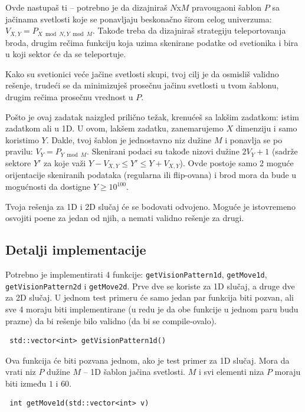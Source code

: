 \documentclass[12pt]{article}
\begin{document}
Ovde nastupaš ti -- potrebno je da dizajniraš $N$x$M$ pravougaoni šablon $P$ sa jačinama svetlosti koje se ponavljaju beskonačno širom celog univerzuma: $V_{X, Y} = P_{X \bmod N, Y \bmod M}$. Takođe treba da dizajniraš strategiju teleportovanja broda, drugim rečima funkciju koja uzima skenirane podatke od svetionika i bira u koji sektor će da se teleportuje.

Kako su svetionici veće jačine svetlosti skupi, tvoj cilj je da osmisliš validno rešenje, trudeći se da minimizuješ prosečnu jačinu svetlosti u tvom šablonu, drugim rečima prosečnu vrednost u $P$.

Pošto je ovaj zadatak naizgled prilično težak, krenućeš sa lakšim zadatkom: istim zadatkom ali u 1D. U ovom, lakšem zadatku, zanemarujemo $X$ dimenziju i samo koristimo $Y$. Dakle, tvoj šablon je jednostavno niz dužine $M$ i ponavlja se po pravilu: $V_Y = P_{Y \bmod M}$. Skenirani podaci su takođe nizovi dužine $2V_Y + 1$ (sadrže sektore $Y'$ za koje važi $Y - V_{X, Y} \leq Y' \leq Y + V_{X, Y}$). Ovde postoje samo 2 moguće orijentacije skeniranih podataka (regularna ili flip-ovana) i brod mora da bude u mogućnosti da dostigne $Y \geq 10^{100}$.

Tvoja rešenja za 1D i 2D slučaj će se bodovati odvojeno. Moguće je istovremeno osvojiti poene za jedan od njih, a nemati validno rešenje za drugi.

\subsection{Detalji implementacije}

Potrebno je implementirati 4 funkcije: \verb|getVisionPattern1d|, \verb|getMove1d|, \verb|getVisionPattern2d| i \verb|getMove2d|. Prve dve se koriste za 1D slučaj, a druge dve za 2D slučaj. U jednom test primeru će samo jedan par funkcija biti pozvan, ali sve 4 moraju biti implementirane (u redu je da obe funkcije u jednom paru budu prazne) da bi rešenje bilo validno (da bi se compile-ovalo).

\begin{lstlisting}
 std::vector<int> getVisionPattern1d()
\end{lstlisting}

Ova funkcija će biti pozvana jednom, ako je test primer za 1D slučaj. Mora da vrati niz $P$ dužine $M$ -- 1D šablon jačina svetlosti. $M$ i svi elementi niza $P$ moraju biti između $1$ i $60$.

\begin{lstlisting}
 int getMove1d(std::vector<int> v)
\end{lstlisting}
\end{document}
